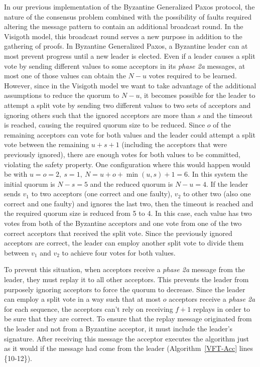 In our previous implementation of the Byzantine Generalized Paxos protocol, the nature of the consensus problem combined with the possibility of faults required altering the message pattern to contain an additional broadcast round. In the Visigoth model, this broadcast round serves a new purpose in addition to the gathering of proofs. In Byzantine Generalized Paxos, a Byzantine leader can at most prevent progress until a new leader is elected. Even if a leader causes a split vote by sending different values to some acceptors in its \textit{phase 2a} messages, at most one of those values can obtain the $N-u$ votes required to be learned. However, since in the Visigoth model we want to take advantage of the additional assumptions to reduce the quorum to $N-u$, it becomes possible for the leader to attempt a split vote by sending two different values to two sets of acceptors and ignoring others such that the ignored acceptors are more than $s$ and the timeout is reached, causing the required quorum size to be reduced. Since $o$ of the remaining acceptors can vote for both values and the leader could attempt a split vote between the remaining $u+s+1$ (including the acceptors that were previously ignored), there are enough votes for both values to be committed, violating the safety property. One configuration where this would happen would be with $u=o=2,\ s=1,\ N=u+o+\min(u,s)+1=6$. In this system the initial quorum is $N-s=5$ and the reduced quorum is $N-u=4$. If the leader sends $v_1$ to two acceptors (one correct and one faulty), $v_2$ to other two (also one correct and one faulty) and ignores the last two, then the timeout is reached and the required quorum size is reduced from 5 to 4. In this case, each value has two votes from both of the Byzantine acceptors and one vote from one of the two correct acceptors that received the split vote. Since the previously ignored acceptors are correct, the leader can employ another split vote to divide them between $v_1$ and $v_2$ to achieve four votes for both values. \par
To prevent this situation, when acceptors receive a \textit{phase 2a} message from the leader, they must replay it to all other acceptors. This prevents the leader from purposely ignoring acceptors to force the quorum to decrease. Since the leader can employ a split vote in a way such that at most $o$ acceptors receive a \textit{phase 2a} for each sequence, the acceptors can't rely on receiving $f+1$ replays in order to be sure that they are correct. To ensure that the replay message originated from the leader and not from a Byzantine acceptor, it must include the leader's signature. After receiving this message the acceptor executes the algorithm just as it would if the message had come from the leader (Algorithm~\ref{VFT-Acc} lines \{10-12\}).


